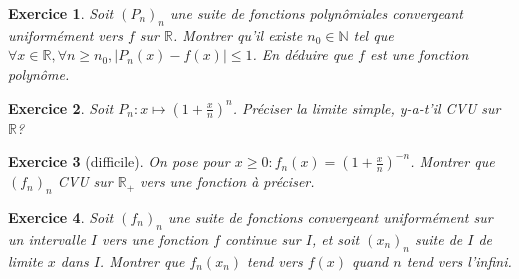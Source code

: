\documentclass[12pt,a4paper]{article}
\newcommand{\R}{\mathbb{R}}
\newcommand{\N}{\mathbb{N}}
\theoremstyle{break}
\theoremstyle{break}
\newtheorem{Exo}{Exercice}
\begin{document}


\begin{Exo}
	Soit $(P_n)_n$ une suite de fonctions polynômiales convergeant uniformément vers $f$ sur $\R$. Montrer qu'il existe $n_0\in\N$ tel que $\forall x\in\R,\forall n\geqslant n_0,\lvert P_n(x)-f(x)\rvert\leqslant 1$. En déduire que $f$ est une fonction polynôme.
\end{Exo}

\begin{Exo}
	Soit $P_n:x\mapsto \left(1+\frac{x}{n}\right)^n$. Préciser la limite simple, y-a-t'il CVU sur $\R$?
\end{Exo}

\begin{Exo}[difficile]
On pose pour $x\geqslant 0:f_n(x)=\left(1+\frac{x}{n}\right)^{-n}$. Montrer que $(f_n)_n$ CVU sur $\R_+$ vers une fonction à préciser.	
\end{Exo}

\begin{Exo}
	Soit $(f_n)_n$ une suite de fonctions convergeant uniformément sur un intervalle $I$ vers une fonction $f$ continue sur $I$, et soit $(x_n)_n$ suite de $I$ de limite $x$ dans $I$. Montrer que $f_n(x_n)$ tend vers $f(x)$ quand $n$ tend vers l'infini.
\end{Exo}


\end{document}
